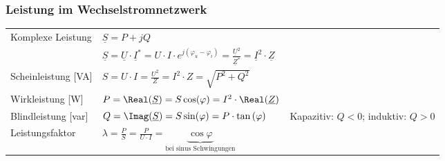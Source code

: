 		\subsubsection{Leistung im Wechselstromnetzwerk}%
				\begin{tabular}{p{4cm}p{7cm}p{7cm}}
					\multirow{2}{4cm}{Komplexe Leistung}  &
						$ \underline{S} = P + jQ$  &\\
						& $ \underline{S} = \underline{U} \cdot \underline{I}^\ast = U\cdot I \cdot e^{j(\varphi_u-\varphi_i)} = \frac{\underline{U}^2}{\underline{Z}^*} = \underline{I}^2 \cdot \underline{Z}$ &
						\\
					Scheinleistung [VA]	& $ S = U\cdot I = \frac{U^2}{Z} 
						= I^2 \cdot Z = \sqrt{P^2+Q^2}$& \\
					Wirkleistung [W] &
						$ P = \Real(\underline{S}) = S \cos(\varphi) = I^2 \cdot \Real(\underline{Z}) $ \\
					Blindleistung [var] &
						$ Q = \Imag(\underline{S}) = S \sin(\varphi)  = P \cdot
						\tan\left(\varphi\right)$ & Kapazitiv: $Q < 0$; induktiv: $Q > 0$ \\
					Leistungsfaktor &
						$\lambda = \frac{P}{S} = \frac{P}{U\cdot I} = \underbrace{\cos \varphi}_{\text{bei sinus Schwingungen}}$ \\
				\end{tabular}
		\renewcommand{\arraystretch}{1}
		
